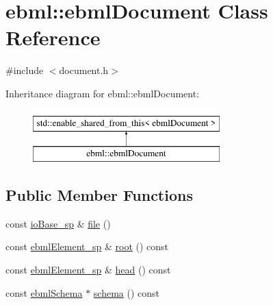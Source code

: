 \hypertarget{classebml_1_1ebmlDocument}{}\section{ebml\+:\+:ebml\+Document Class Reference}
\label{classebml_1_1ebmlDocument}


{\ttfamily \#include $<$document.\+h$>$}

Inheritance diagram for ebml\+:\+:ebml\+Document\+:\begin{figure}[H]
\begin{center}
\leavevmode
\includegraphics[height=2.000000cm]{classebml_1_1ebmlDocument}
\end{center}
\end{figure}
\subsection*{Public Member Functions}
\begin{DoxyCompactItemize}
\item 
const \mbox{\hyperlink{namespaceebml_a7bb59128ac6af27e47367938a846b569}{io\+Base\+\_\+sp}} \& \mbox{\hyperlink{classebml_1_1ebmlDocument_ab95de6cd5be1fbeefb5a50cc001c42cc}{file}} ()
\item 
const \mbox{\hyperlink{namespaceebml_adad533b7705a16bb360fe56380c5e7be}{ebml\+Element\+\_\+sp}} \& \mbox{\hyperlink{classebml_1_1ebmlDocument_a012478219e8197111084ba55dc0586a5}{root}} () const
\item 
const \mbox{\hyperlink{namespaceebml_adad533b7705a16bb360fe56380c5e7be}{ebml\+Element\+\_\+sp}} \& \mbox{\hyperlink{classebml_1_1ebmlDocument_addbc9eaabb0d2a608b6a19e4f7b5e17b}{head}} () const
\item 
const \mbox{\hyperlink{classebml_1_1ebmlSchema}{ebml\+Schema}} $\ast$ \mbox{\hyperlink{classebml_1_1ebmlDocument_aff3d1abece0a2bedf5a90e6af0ff3ddd}{schema}} () const
\end{DoxyCompactItemize}
